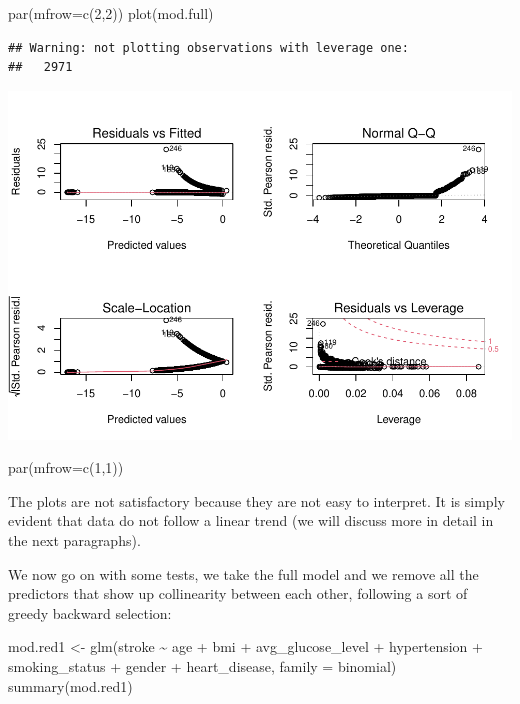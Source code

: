 \documentclass[
]{article}
\newenvironment{Shaded}{\begin{snugshade}}{\end{snugshade}}
\newcommand{\AttributeTok}[1]{\textcolor[rgb]{0.77,0.63,0.00}{#1}}
\newcommand{\DecValTok}[1]{\textcolor[rgb]{0.00,0.00,0.81}{#1}}
\newcommand{\FunctionTok}[1]{\textcolor[rgb]{0.00,0.00,0.00}{#1}}
\newcommand{\NormalTok}[1]{#1}
\newcommand{\OtherTok}[1]{\textcolor[rgb]{0.56,0.35,0.01}{#1}}
\newcommand{\SpecialCharTok}[1]{\textcolor[rgb]{0.00,0.00,0.00}{#1}}
\begin{document}
\begin{Shaded}
\begin{Highlighting}[]
\FunctionTok{par}\NormalTok{(}\AttributeTok{mfrow=}\FunctionTok{c}\NormalTok{(}\DecValTok{2}\NormalTok{,}\DecValTok{2}\NormalTok{))}
\FunctionTok{plot}\NormalTok{(mod.full)}
\end{Highlighting}
\end{Shaded}

\begin{verbatim}
## Warning: not plotting observations with leverage one:
##   2971
\end{verbatim}

\includegraphics{stat-project-stroke_files/figure-latex/unnamed-chunk-13-1.pdf}

\begin{Shaded}
\begin{Highlighting}[]
\FunctionTok{par}\NormalTok{(}\AttributeTok{mfrow=}\FunctionTok{c}\NormalTok{(}\DecValTok{1}\NormalTok{,}\DecValTok{1}\NormalTok{))}
\end{Highlighting}
\end{Shaded}

The plots are not satisfactory because they are not easy to interpret.
It is simply evident that data do not follow a linear trend (we will
discuss more in detail in the next paragraphs).

We now go on with some tests, we take the full model and we remove all
the predictors that show up collinearity between each other, following a
sort of greedy backward selection:

\begin{Shaded}
\begin{Highlighting}[]
\NormalTok{mod.red1 }\OtherTok{\textless{}{-}} \FunctionTok{glm}\NormalTok{(stroke }\SpecialCharTok{\textasciitilde{}}\NormalTok{ age }\SpecialCharTok{+}\NormalTok{ bmi }\SpecialCharTok{+}\NormalTok{ avg\_glucose\_level }\SpecialCharTok{+}\NormalTok{ hypertension }\SpecialCharTok{+} 
\NormalTok{                  smoking\_status }\SpecialCharTok{+}\NormalTok{ gender }\SpecialCharTok{+}\NormalTok{ heart\_disease, }\AttributeTok{family =}\NormalTok{ binomial)}
\FunctionTok{summary}\NormalTok{(mod.red1)}
\end{Highlighting}
\end{Shaded}
\end{document}
